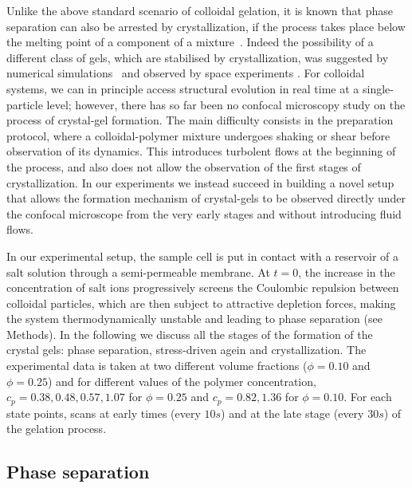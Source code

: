 \documentclass[twocolumn,superscriptaddress,showpacs,preprintnumbers,
amsmath,amssymb,prl]{revtex4-1}
\begin{document}
Unlike the above standard scenario of colloidal gelation, it is known that phase separation can also be arrested by crystallization, if the process takes place below the melting point of a component of a mixture~\cite{tanaka1985new}. 
Indeed the possibility of a different class of gels, which are stabilised by crystallization, 
was suggested by numerical simulations~\cite{fortini2008crystallization,perez2011pathways} and observed by space experiments \cite{sabin2012}.
For colloidal systems, we can in principle access structural evolution in real time at a single-particle level; however, there has so far been no confocal microscopy  
study on the process of crystal-gel formation. The main difficulty consists in the preparation protocol, where a colloidal-polymer mixture undergoes
shaking or shear before observation of its dynamics. This introduces turbolent flows at the beginning of the process, and also does not allow the
observation of the first stages of crystallization.
In our experiments we instead succeed in building a novel setup that allows the formation mechanism of crystal-gels to be observed directly
under the confocal microscope from the very early stages and without introducing fluid flows.

In our experimental setup, the sample cell is put in contact with a reservoir of a salt solution through a semi-permeable membrane.
At $t=0$, the increase in the concentration of salt ions progressively screens the Coulombic repulsion between colloidal particles,
which are then subject to attractive depletion forces, making the system thermodynamically unstable and leading to phase separation (see Methods).
In the following we discuss all the stages of the formation of the crystal gels: phase separation, stress-driven agein and crystallization.
The experimental data is taken at two different volume fractions ($\phi=0.10$ and $\phi=0.25$) and for different values
of the polymer concentration, $c_p=0.38,0.48,0.57,1.07$ for $\phi=0.25$ and $c_p=0.82,1.36$ for $\phi=0.10$.
For each state points, scans at early times (every $10s$) and at the late stage (every $30s$) of the gelation process.

\subsection*{Phase separation}
\end{document}
